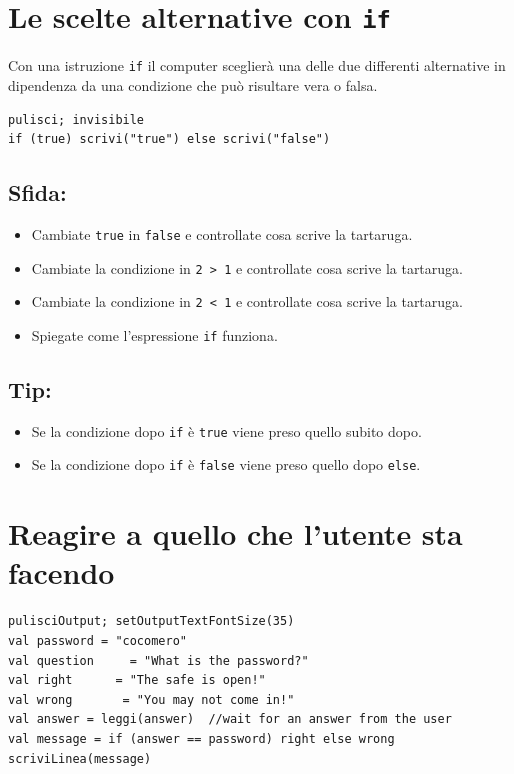 \chapter{Le scelte alternative con \lstinline{if}}Con una istruzione \lstinline{if} il computer sceglierà una delle due differenti alternative in dipendenza da una condizione che può risultare vera o falsa.

\begin{lstlisting}[basicstyle={\ttfamily\fontsize{20}{24}\selectfont},numbers=none]
pulisci; invisibile
if (true) scrivi("true") else scrivi("false")
\end{lstlisting}
        
\section*{\color{BrickRed}Sfida:}


\begin{itemize}

\item {Cambiate \lstinline{true} in \lstinline{false} e controllate cosa scrive la tartaruga.}
\item {Cambiate la condizione in \lstinline{2 > 1} e controllate cosa scrive la tartaruga.}
\item {Cambiate la condizione in \lstinline{2 < 1} e controllate cosa scrive la tartaruga.}
\item {Spiegate come l'espressione \lstinline{if} funziona.}

\end{itemize}


\section*{\color{OliveGreen}Tip:}


\begin{itemize}

\item {Se la condizione dopo \lstinline{if} è \lstinline{true} viene preso quello subito dopo.}
\item {Se la condizione dopo \lstinline{if} è \lstinline{false} viene preso quello dopo \lstinline{else}.}

\end{itemize}


\chapter{Reagire a quello che l'utente sta facendo}
\begin{lstlisting}[basicstyle={\ttfamily\fontsize{20}{24}\selectfont},numbers=none]
pulisciOutput; setOutputTextFontSize(35)
val password = "cocomero"
val question     = "What is the password?"
val right      = "The safe is open!"
val wrong       = "You may not come in!"
val answer = leggi(answer)  //wait for an answer from the user
val message = if (answer == password) right else wrong
scriviLinea(message)
\end{lstlisting}
        
